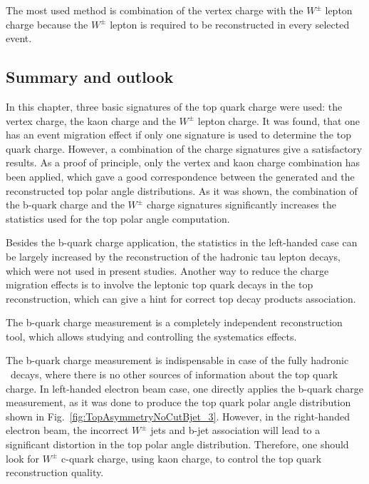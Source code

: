 The most used method is combination of the vertex charge with the $W^\pm$ lepton charge because the $W^\pm$ lepton is required to be reconstructed in every selected event. 

\subsection{Summary and outlook}

In this chapter, three basic signatures of the top quark charge were used: the vertex charge, the kaon charge and the $W^\pm$ lepton charge. 
It was found, that one has an event migration effect if only one signature is used to determine the top quark charge. 
However, a combination of the charge signatures give a satisfactory results.
As a proof of principle, only the vertex and kaon charge combination has been applied, which gave a good correspondence between the generated and the reconstructed top polar angle distributions.
As it was shown, the combination of the b-quark charge and the $W^\pm$ charge signatures significantly increases the statistics used for the top polar angle computation.

Besides the b-quark charge application, the statistics in the left-handed case can be largely increased by the reconstruction of the hadronic tau lepton decays, which were not used in present studies. 
Another way to reduce the charge migration effects is to involve the leptonic top quark decays in the top reconstruction, which can give a hint for correct top decay products association.

The b-quark charge measurement is a completely independent reconstruction tool, which allows studying and controlling the systematics effects.

The b-quark charge measurement is indispensable in case of the fully hadronic \ttbar\ decays, where there is no other sources of information about the top quark charge. 
In left-handed electron beam case, one directly applies the b-quark charge measurement, as it was done to produce the top quark polar angle distribution shown in Fig.~\ref{fig:TopAsymmetryNoCutBjet_3}. 
However, in the right-handed electron beam, the incorrect $W^\pm$ jets and b-jet association will lead to a significant distortion in the top polar angle distribution. Therefore, one should look for $W^\pm$ c-quark charge, using kaon charge, to control the top quark reconstruction quality. 


